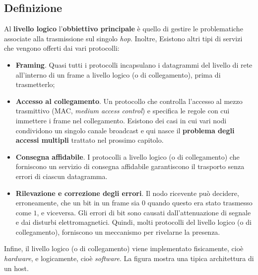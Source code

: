 \documentclass[a4paper]{article}
\begin{document}
	\subsection{Definizione}

	Al \textcolor{Red3}{\textbf{livello logico}} l'\textbf{obbiettivo principale} è quello di gestire le problematiche associate alla trasmissione sul singolo \emph{hop}. Inoltre, Esistono altri tipi di servizi che vengono offerti dai vari protocolli:
	\begin{itemize}
		\item \textcolor{Red3}{\textbf{Framing}}. Quasi tutti i protocolli incapsulano i datagrammi del livello di rete all'interno di un frame a livello logico (o di collegamento), prima di trasmetterlo;
		
		\item \textcolor{Red3}{\textbf{Accesso al collegamento}}. Un protocollo che controlla l'accesso al mezzo trasmittivo (MAC, \emph{medium access control}) e specifica le regole con cui immettere i frame nel collegamento. Esistono dei casi in cui vari nodi condividono un singolo canale broadcast e qui nasce il \textbf{problema degli accessi multipli} trattato nel prossimo capitolo.
		
		\item \textcolor{Red3}{\textbf{Consegna affidabile}}. I protocolli a livello logico (o di collegamento) che forniscono un servizio di consegna affidabile garantiscono il trasporto senza errori di ciascun datagramma.
		
		\item \textcolor{Red3}{\textbf{Rilevazione e correzione degli errori}}. Il nodo ricevente può decidere, erroneamente, che un bit in un frame sia $0$ quando questo era stato trasmesso come $1$, e viceversa. Gli errori di bit sono causati dall’attenuazione di segnale e dai disturbi elettromagnetici. Quindi, molti protocolli del livello logico (o di collegamento), forniscono un meccanismo per rivelarne la presenza.
	\end{itemize}
	Infine, il livello logico (o di collegamento) viene implementato fisicamente, cioè \emph{hardware}, e logicamente, cioè \emph{software}. La figura mostra una tipica architettura di un host.\newpage
	
\end{document}

